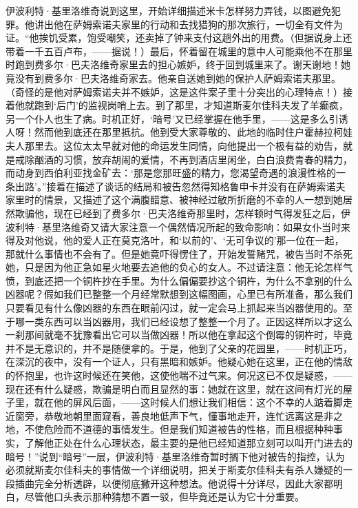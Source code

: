 \par 伊波利特·基里洛维奇说到这里，开始详细描述米卡怎样努力弄钱，以图避免犯罪。他讲出他在萨姆索诺夫家里的行动和去找猎狗的那次旅行，一切全有文件为证。“他挨饥受累，饱受嘲笑，还卖掉了钟来支付这趟外出的用费。（但据说身上还带着一千五百卢布，——据说！）最后，怀着留在城里的意中人可能乘他不在那里时跑到费多尔·巴夫洛维奇家里去的担心嫉妒，终于回到城里来了。谢天谢地！她竟没有到费多尔·巴夫洛维奇家去。他亲自送她到她的保护人萨姆索诺夫那里。（奇怪的是他对萨姆索诺夫并不嫉妒，这是这件案子里十分突出的心理特点！）接着他就跑到‘后门’的监视岗哨上去。到了那里，才知道斯麦尔佳科夫发了羊癫疯，另一个仆人也生了病。时机正好，‘暗号’又已经掌握在他手里，——这是多么引诱人呀！然而他到底还在那里抵抗。他到受大家尊敬的、此地的临时住户霍赫拉柯娃夫人那里去。这位太太早就对他的命运发生同情，向他提出一个极有益的劝告，就是戒除酗酒的习惯，放弃胡闹的爱情，不再到酒店里闲坐，白白浪费青春的精力，而动身到西伯利亚找金矿去：‘那是您那旺盛的精力，您渴望奇遇的浪漫性格的一条出路’。”接着在描述了谈话的结局和被告忽然得知格鲁申卡并没有在萨姆索诺夫家里时的情景，又描述了这个满腹醋意、被神经过敏所折磨的不幸的人一想到她居然欺骗他，现在已经到了费多尔·巴夫洛维奇那里时，怎样顿时气得发狂之后，伊波利特·基里洛维奇又请大家注意一个偶然情况所起的致命影响：如果女仆当时来得及对他说，他的爱人正在莫克洛叶，和‘以前的’、‘无可争议的’那一位在一起，那就什么事情也不会有了。但是她竟吓得愣住了，开始发誓赌咒，被告当时不杀死她，只是因为他正急如星火地要去追他的负心的女人。不过请注意：他无论怎样气愤，到底还把一个铜杵抄在手里。为什么偏偏要抄这个铜杵，为什么不拿别的什么凶器呢？假如我们已整整一个月经常默想到这幅图画，心里已有所准备，那么我们只要看见有什么像凶器的东西在眼前闪过，就一定会马上抓起来当凶器使用的。至于哪一类东西可以当凶器用，我们已经设想了整整一个月了。正因这样所以才这么一刹那间就毫不犹豫看出它可以当做凶器！所以他在拿起这个倒霉的铜杵时，毕竟并不是无意识的，并不是随便拿的。于是，他到了父亲的花园里，——时机正巧，在深沉的夜中，没有一个证人，只有黑暗和嫉妒。他疑心她在这里，正在他的情敌的怀抱里，也许这时候还在笑他，这使他喘不过气来。何况这已不仅是疑惑，——现在还有什么疑惑，欺骗是明白而且显然的事：她就在这里，就在这间有灯光的屋子里，就在他的屏风后面，——这时候人们想让我们相信：这个不幸的人踮着脚走近窗旁，恭敬地朝里面窥看，善良地低声下气，懂事地走开，连忙远离这是非之地，不使危险而不道德的事情发生。但是我们知道被告的性格，而且根据种种事实，了解他正处在什么心理状态，最主要的是他已经知道那立刻可以叫开门进去的暗号！”说到“暗号”一层，伊波利特·基里洛维奇暂时搁下他对被告的指控，认为必须就斯麦尔佳科夫的事情做一个详细说明，把关于斯麦尔佳科夫有杀人嫌疑的一段插曲完全分析透辟，以便彻底撇开这种想法。他说得十分详尽，因此大家都明白，尽管他口头表示那种猜想不置一驳，但毕竟还是认为它十分重要。
